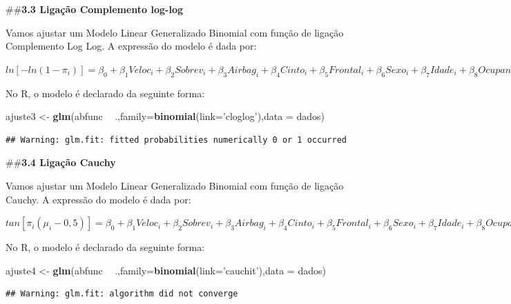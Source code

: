 \documentclass[]{article}
\newenvironment{Shaded}{\begin{snugshade}}{\end{snugshade}}
\newcommand{\KeywordTok}[1]{\textcolor[rgb]{0.13,0.29,0.53}{\textbf{#1}}}
\newcommand{\DataTypeTok}[1]{\textcolor[rgb]{0.13,0.29,0.53}{#1}}
\newcommand{\StringTok}[1]{\textcolor[rgb]{0.31,0.60,0.02}{#1}}
\newcommand{\OperatorTok}[1]{\textcolor[rgb]{0.81,0.36,0.00}{\textbf{#1}}}
\newcommand{\NormalTok}[1]{#1}
\begin{document}
\#\#\textbf{3.3 Ligação Complemento log-log}

Vamos ajustar um Modelo Linear Generalizado Binomial com função de
ligação Complemento Log Log. A expressão do modelo é dada por:

\(ln[-ln(1-\pi_i)] = \beta_0 + \beta_1 Veloc_i + \beta_2 Sobrev_i + \beta_3 Airbag_i + \beta_4 Cinto_i + \beta_5 Frontal_i + \beta_6 Sexo_i + \beta_7 Idade_i + \beta_8 Ocupantes_i + \beta_9 Grav_i\)

No R, o modelo é declarado da seguinte forma:

\begin{Shaded}
\begin{Highlighting}[]
\NormalTok{ajuste3 <-}\StringTok{ }\KeywordTok{glm}\NormalTok{(abfunc }\OperatorTok{~}\StringTok{ }\NormalTok{.,}\DataTypeTok{family=}\KeywordTok{binomial}\NormalTok{(}\DataTypeTok{link=}\StringTok{'cloglog'}\NormalTok{),}\DataTypeTok{data =}\NormalTok{ dados)}
\end{Highlighting}
\end{Shaded}

\begin{verbatim}
## Warning: glm.fit: fitted probabilities numerically 0 or 1 occurred
\end{verbatim}

\#\#\textbf{3.4 Ligação Cauchy}

Vamos ajustar um Modelo Linear Generalizado Binomial com função de
ligação Cauchy. A expressão do modelo é dada por:

\(tan[\pi_i(\mu_i- 0,5)] = \beta_0 + \beta_1 Veloc_i + \beta_2 Sobrev_i + \beta_3 Airbag_i + \beta_4 Cinto_i + \beta_5 Frontal_i + \beta_6 Sexo_i + \beta_7 Idade_i + \beta_8 Ocupantes_i + \beta_9 Grav_i\)

No R, o modelo é declarado da seguinte forma:

\begin{Shaded}
\begin{Highlighting}[]
\NormalTok{ajuste4 <-}\StringTok{ }\KeywordTok{glm}\NormalTok{(abfunc }\OperatorTok{~}\StringTok{ }\NormalTok{.,}\DataTypeTok{family=}\KeywordTok{binomial}\NormalTok{(}\DataTypeTok{link=}\StringTok{'cauchit'}\NormalTok{),}\DataTypeTok{data =}\NormalTok{ dados)}
\end{Highlighting}
\end{Shaded}

\begin{verbatim}
## Warning: glm.fit: algorithm did not converge
\end{verbatim}
\end{document}
